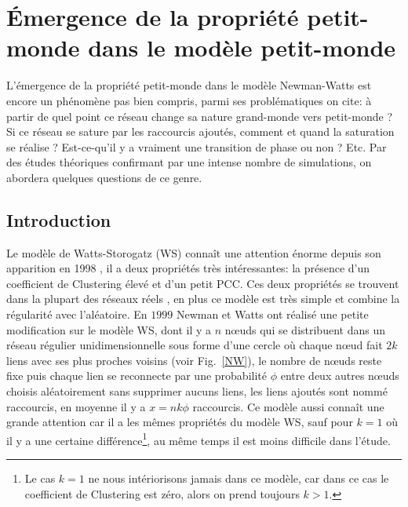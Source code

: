 \chapter{Émergence de la propriété petit-monde dans le modèle petit-monde}
L'émergence de la propriété petit-monde dans le modèle Newman-Watts est encore un phénomène pas bien compris, parmi ses problématiques on cite: à partir de quel point ce réseau change sa nature grand-monde vers petit-monde ? Si ce réseau se sature par les raccourcis ajoutés, comment et quand la saturation se réalise ? Est-ce-qu'il y a vraiment une transition de phase ou non ? Etc.
Par des études théoriques confirmant par une intense nombre de simulations, on abordera quelques questions de ce genre.
\section{Introduction}

Le modèle de Watts-Storogatz (WS) connaît une attention énorme depuis son apparition en 1998 \cite{Watss-Strogatz1998}, il a deux propriétés très intéressantes: la présence d'un coefficient de Clustering élevé et d'un petit PCC. Ces deux propriétés se trouvent dans la plupart des réseaux réels \cite{Cohen-Havlinl2010,Newman2010}, en plus ce modèle est très simple et combine la régularité avec l'aléatoire. En $1999$ Newman et Watts \cite{Newman-Watts1999} ont réalisé une petite modification sur le modèle WS, dont il y a $n$ nœuds qui se distribuent dans un réseau régulier unidimensionnelle sous forme d'une cercle où chaque nœud fait $2k$ liens avec ses plus proches voisins (voir Fig.~\ref{NW}), le nombre de nœuds reste fixe puis chaque lien se reconnecte par une probabilité $\phi$ entre deux autres nœuds choisis aléatoirement sans supprimer aucuns liens, les liens ajoutés sont nommé raccourcis, en moyenne il y a $x=nk\phi$ raccourcis. Ce modèle aussi connaît une grande attention car il a les m\^{e}mes propriétés du modèle WS, sauf pour $k=1$ où il y a une certaine différence\footnote{Le cas $k=1$ ne nous intériorisons jamais dans ce modèle, car dans ce cas le coefficient de Clustering est zéro, alors on prend toujours $k>1$. }, au m\^{e}me temps il est moins difficile dans l'étude.

